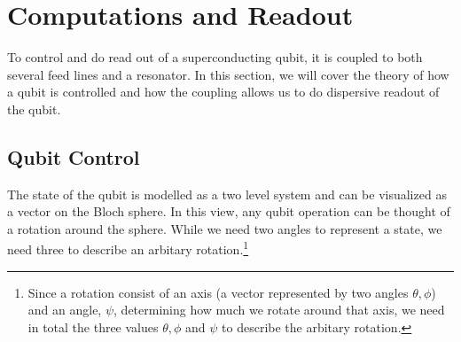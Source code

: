 \chapter{Computations and Readout}\label{chap:computations_and_readout}
To control and do read out of a superconducting qubit, it is coupled to both several feed lines and a resonator. In this section, we will cover the theory of how a qubit is controlled and how the coupling allows us to do dispersive readout of the qubit.

\section{Qubit Control}\label{sec:qubit_control}
The state of the qubit is modelled as a two level system and can be visualized as a vector on the Bloch sphere. In this view, any qubit operation can be thought of a rotation around the sphere. While we need two angles to represent a state, we need three to describe an arbitary rotation.\footnote{Since a rotation consist of an axis (a vector represented by two angles $\theta, \phi$) and an angle, $\psi$, determining how much we rotate around that axis, we need in total the three values $\theta, \phi$ and $\psi$ to describe the arbitary rotation.}

